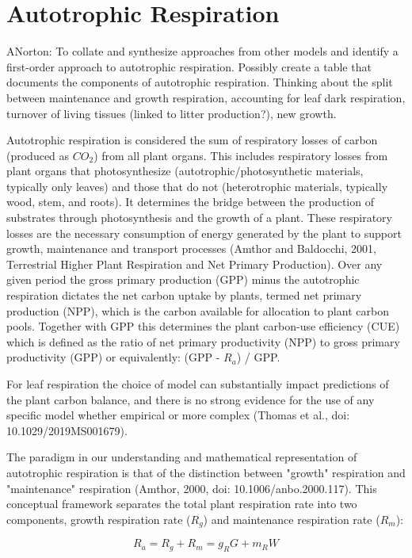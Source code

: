 \documentclass[twoside,10pt]{report}
\begin{document}
\section{Autotrophic Respiration}

ANorton: To collate and synthesize approaches from other models and identify a first-order approach to autotrophic respiration. Possibly create a table that documents the components of autotrophic respiration. Thinking about the split between maintenance and growth respiration, accounting for leaf dark respiration, turnover of living tissues (linked to litter production?), new growth. 


Autotrophic respiration is considered the sum of respiratory losses of carbon (produced as $CO_2$) from all plant organs. This includes respiratory losses from plant organs that photosynthesize (autotrophic/photosynthetic materials, typically only leaves) and those that do not (heterotrophic materials, typically wood, stem, and roots). It determines the bridge between the production of substrates through photosynthesis and the growth of a plant. These respiratory losses are the necessary consumption of energy generated by the plant to support growth, maintenance and transport processes (Amthor and Baldocchi, 2001, Terrestrial Higher Plant Respiration and Net Primary Production). Over any given period the gross primary production (GPP) minus the autotrophic respiration dictates the net carbon uptake by plants, termed net primary production (NPP), which is the carbon available for allocation to plant carbon pools. Together with GPP this determines the plant carbon-use efficiency (CUE) which is defined as the ratio of net primary productivity (NPP) to gross primary productivity (GPP) or equivalently: (GPP - $R_a$) / GPP. 

For leaf respiration the choice of model can substantially impact predictions of the plant carbon balance, and there is no strong evidence for the use of any specific model whether empirical or more complex (Thomas et al., doi: 10.1029/2019MS001679). 

The paradigm in our understanding and mathematical representation of autotrophic respiration is that of the distinction between "growth" respiration and "maintenance" respiration (Amthor, 2000, doi: 10.1006/anbo.2000.117). This conceptual framework separates the total plant respiration rate into two components, growth respiration rate ($R_g$) and maintenance respiration rate ($R_m$):

\begin{equation}
\label{e:rauto_conceptual_gmp}
    R_a = R_g + R_m = g_R G + m_R W
\end{equation}
\end{document}
